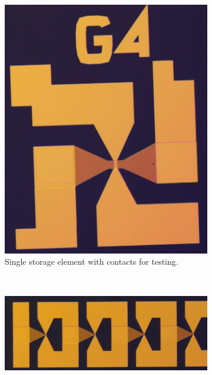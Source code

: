 \begin{figure}
    \centering
    \begin{subfigure}[b]{0.35\paperwidth}
    	\centering
        \includegraphics[width=0.15\paperwidth]{img/04/fab_single.jpg}
        \caption{Single storage element with contacts for testing.}
        \label{FabricationSampDeta}
    \end{subfigure}
    ~ %
    \begin{subfigure}[b]{0.35\paperwidth}
    	\centering
        \includegraphics[width=0.3\paperwidth]{img/04/fab_series_big.jpg}

\end{subfigure}
\end{figure}
